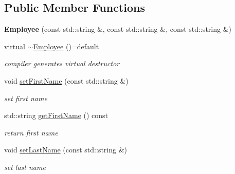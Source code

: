 \subsection*{Public Member Functions}
\begin{DoxyCompactItemize}
\item 
\mbox{\label{class_employee_aea37f8ab922dd5c4e4e033506efe4ad8}} 
{\bfseries Employee} (const std\+::string \&, const std\+::string \&, const std\+::string \&)
\item 
\mbox{\label{class_employee_a01aa009d0ef6b36afdc4aea4da1123a1}} 
virtual \mbox{\hyperlink{class_employee_a01aa009d0ef6b36afdc4aea4da1123a1}{$\sim$\+Employee}} ()=default
\begin{DoxyCompactList}\small\item\em compiler generates virtual destructor \end{DoxyCompactList}\item 
\mbox{\label{class_employee_a15e4ef686f54493b5afe52497000675e}} 
void \mbox{\hyperlink{class_employee_a15e4ef686f54493b5afe52497000675e}{set\+First\+Name}} (const std\+::string \&)
\begin{DoxyCompactList}\small\item\em set first name \end{DoxyCompactList}\item 
\mbox{\label{class_employee_aef7422ec385231d030f1bf3f53d8563b}} 
std\+::string \mbox{\hyperlink{class_employee_aef7422ec385231d030f1bf3f53d8563b}{get\+First\+Name}} () const
\begin{DoxyCompactList}\small\item\em return first name \end{DoxyCompactList}\item 
\mbox{\label{class_employee_a784d4bd99607405393f46e8648008a42}} 
void \mbox{\hyperlink{class_employee_a784d4bd99607405393f46e8648008a42}{set\+Last\+Name}} (const std\+::string \&)
\begin{DoxyCompactList}\small\item\em set last name \end{DoxyCompactList}\item 
\mbox{\label{class_employee_a9a9e3d0c77c609e5016589926844b003}} 

\end{DoxyCompactItemize}
